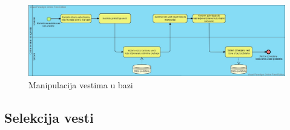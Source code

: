 \documentclass{article}
\begin{document}
\begin{figure}[htbp!]
    \centering
    \includegraphics[scale=0.3]{Manipulacija_vestima_u_bazi.jpg}
    \caption{Manipulacija vestima u bazi}
    \label{slk:dtp}
\end{figure}

\newpage

\subsection{Selekcija vesti}
\end{document}
